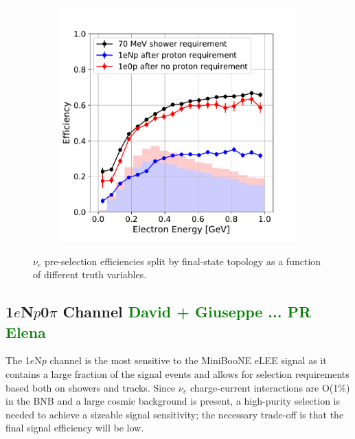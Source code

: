 \documentclass[a4paper]{article}
\newcommand{\npsel}{1$e$N$p$0$\pi$ }
\begin{document}
\begin{figure}[H]
\begin{center}
\begin{subfigure}[b]{0.3\textwidth}
    \caption{\label{fig:nue:presel:eff:proton} }
    \end{subfigure}
    \begin{subfigure}[b]{0.3\textwidth}
    \centering
    \includegraphics[width=1.00\textwidth]{nueselection/elec_RUN1.pdf}
    \caption{\label{fig:nue:presel:eff:elec} }
    \end{subfigure}
\caption{\label{fig:nue:presel:eff} $\nu_e$ pre-selection efficiencies split by final-state topology as a function of different truth variables. }
\end{center}
\end{figure}

\subsection{\npsel Channel \textcolor{green}{David + Giuseppe ... PR Elena}}
\label{sec:nueselection:1eNp}

The 1$e$N$p$ channel is the most sensitive to the MiniBooNE eLEE signal as it contains a large fraction of the signal events and allows for selection requirements based both on showers and tracks. Since $\nu_e$ charge-current interactions are O(1\%) in the BNB and a large cosmic background is present, a high-purity selection is needed to achieve a sizeable signal sensitivity; the necessary trade-off is that the final signal efficiency will be low.
\end{document}
